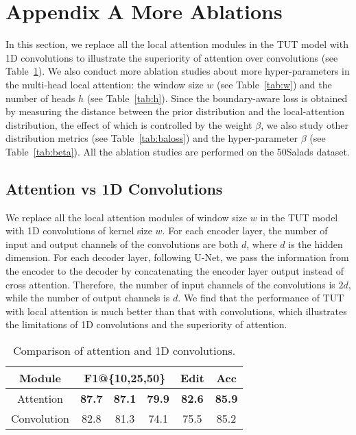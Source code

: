 \documentclass[letterpaper]{article} \usepackage[submission]{aaai23}  \usepackage{times}  \usepackage{helvet}  \usepackage{courier}  \usepackage[hyphens]{url}  \usepackage{graphicx} \urlstyle{rm} \def\UrlFont{\rm}  \usepackage{natbib}  \usepackage{caption} \frenchspacing  \setlength{\pdfpagewidth}{8.5in} \setlength{\pdfpageheight}{11in} \usepackage{algorithm}
\begin{document}
\appendix






\clearpage
\appendix

\section{Appendix A More Ablations}
In this section, we replace all the local attention modules in the TUT model with 1D convolutions to illustrate the superiority of attention over convolutions (see Table~\ref{tab:conv}). We also conduct more ablation studies about more hyper-parameters in the multi-head local attention: the window size $w$ (see Table~\ref{tab:w}) and the number of heads $h$ (see Table~\ref{tab:h}). Since the boundary-aware loss is obtained by measuring the distance between the prior distribution and the local-attention distribution, the effect of which is controlled by the weight $\beta$, we also study other distribution metrics (see Table~\ref{tab:baloss}) and the hyper-parameter $\beta$ (see Table~\ref{tab:beta}). All the ablation studies are performed on the
50Salads dataset.

\subsection{Attention vs 1D Convolutions}
We replace all the local attention modules of window size $w$ in the TUT model with 1D convolutions of kernel size $w$. For each encoder layer, the number of input and output channels of the convolutions are both $d$, where $d$ is the hidden dimension. For each decoder layer, following U-Net, we pass the information from the encoder to the decoder by concatenating the encoder layer output instead of cross attention. Therefore, the number of input channels of the convolutions is $2d$, while the number of output channels is $d$. We find that the performance of TUT with local attention is much better than that with convolutions, which illustrates the limitations of 1D convolutions and the superiority of attention.


\begin{table}[ht]
\centering
\begin{tabular}{cccccc}
    \toprule
    Module   & \multicolumn{3}{c}{F1@\{10,25,50\}} & Edit & Acc\\
    \midrule
    Attention & \textbf{87.7} & \textbf{87.1} & \textbf{79.9} & \textbf{82.6} & \textbf{85.9}\\
    Convolution & 82.8 & 81.3 & 74.1 & 75.5 & 85.2\\
    \bottomrule
\end{tabular}
\caption{Comparison of attention and 1D convolutions.}
\label{tab:conv}
\end{table}
\end{document}
